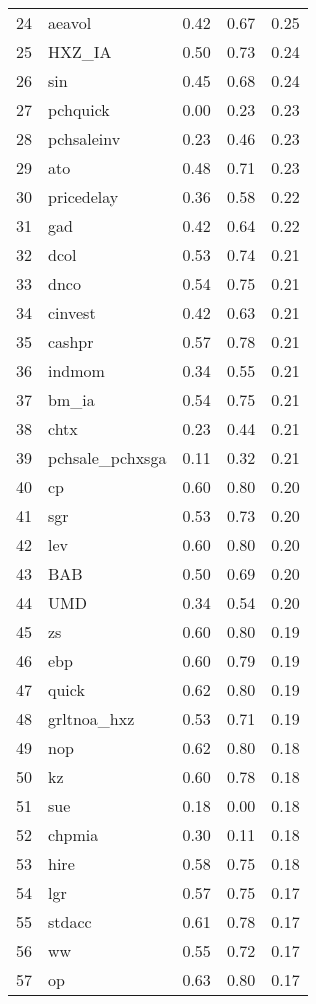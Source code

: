 \documentclass[12pt]{article}
\begin{document}
\begin{footnotesize}
\begin{longtable}{rl|c|c|c}
  24 & aeavol & 0.42 & 0.67 & 0.25 \\ 
  25 & HXZ\_IA & 0.50 & 0.73 & 0.24 \\ 
  26 & sin & 0.45 & 0.68 & 0.24 \\ 
  27 & pchquick & 0.00 & 0.23 & 0.23 \\ 
  28 & pchsaleinv & 0.23 & 0.46 & 0.23 \\ 
  29 & ato & 0.48 & 0.71 & 0.23 \\ 
  30 & pricedelay & 0.36 & 0.58 & 0.22 \\ 
  31 & gad & 0.42 & 0.64 & 0.22 \\ 
  32 & dcol & 0.53 & 0.74 & 0.21 \\ 
  33 & dnco & 0.54 & 0.75 & 0.21 \\ 
  34 & cinvest & 0.42 & 0.63 & 0.21 \\ 
  35 & cashpr & 0.57 & 0.78 & 0.21 \\ 
  36 & indmom & 0.34 & 0.55 & 0.21 \\ 
  37 & bm\_ia & 0.54 & 0.75 & 0.21 \\ 
  38 & chtx & 0.23 & 0.44 & 0.21 \\ 
  39 & pchsale\_pchxsga & 0.11 & 0.32 & 0.21 \\ 
  40 & cp & 0.60 & 0.80 & 0.20 \\ 
  41 & sgr & 0.53 & 0.73 & 0.20 \\ 
  42 & lev & 0.60 & 0.80 & 0.20 \\ 
  43 & BAB & 0.50 & 0.69 & 0.20 \\ 
  44 & UMD & 0.34 & 0.54 & 0.20 \\ 
  45 & zs & 0.60 & 0.80 & 0.19 \\ 
  46 & ebp & 0.60 & 0.79 & 0.19 \\ 
  47 & quick & 0.62 & 0.80 & 0.19 \\ 
  48 & grltnoa\_hxz & 0.53 & 0.71 & 0.19 \\ 
  49 & nop & 0.62 & 0.80 & 0.18 \\ 
  50 & kz & 0.60 & 0.78 & 0.18 \\ 
  51 & sue & 0.18 & 0.00 & 0.18 \\ 
  52 & chpmia & 0.30 & 0.11 & 0.18 \\ 
  53 & hire & 0.58 & 0.75 & 0.18 \\ 
  54 & lgr & 0.57 & 0.75 & 0.17 \\ 
  55 & stdacc & 0.61 & 0.78 & 0.17 \\ 
  56 & ww & 0.55 & 0.72 & 0.17 \\ 
  57 & op & 0.63 & 0.80 & 0.17 \\ 

\end{longtable}
\end{footnotesize}
\end{document}
